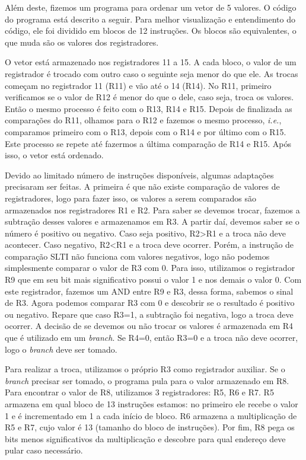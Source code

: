 \documentclass[11pt,a4paper,titlepage]{article}
\begin{document}
Além deste, fizemos um programa para ordenar um vetor de 5 valores.
O código do programa está descrito a seguir.
Para melhor visualização e entendimento do código, ele foi dividido em blocos de 12 instruções.
Os blocos são equivalentes, o que muda são os valores dos registradores.

O vetor está armazenado nos registradores 11 a 15.
A cada bloco, o valor de um registrador é trocado com outro caso o seguinte seja menor do que ele.
As trocas começam no registrador 11 (R11) e vão até o 14 (R14).
No R11, primeiro verificamos se o valor de R12 é menor do que o dele, caso seja, troca os valores.
Então o mesmo processo é feito com o R13, R14 e R15.
Depois de finalizada as comparações do R11, olhamos para o R12 e fazemos o mesmo processo, \textit{i.e.}, comparamos primeiro com o R13, depois com o R14 e por último com o R15.
Este processo se repete até fazermos a última comparação de R14 e R15.
Após isso, o vetor está ordenado.

Devido ao limitado número de instruções disponíveis, algumas adaptações precisaram ser feitas.
A primeira é que não existe comparação de valores de registradores, logo para fazer isso, os valores a serem comparados são armazenados nos registradores R1 e R2.
Para saber se devemos trocar, fazemos a subtração desses valores e armazenamos em R3.
A partir daí, devemos saber se o número é positivo ou negativo.
Caso seja positivo, R2>R1 e a troca não deve acontecer.
Caso negativo, R2<R1 e a troca deve ocorrer.
Porém, a instrução de comparação SLTI não funciona com valores negativos, logo não podemos simplesmente comparar o valor de R3 com 0.
Para isso, utilizamos o registrador R9 que em seu bit mais significativo possui o valor 1 e nos demais o valor 0.
Com este registrador, fazemos um AND entre R9 e R3, dessa forma, sabemos o sinal de R3.
Agora podemos comparar R3 com 0 e descobrir se o resultado é positivo ou negativo.
Repare que caso R3=1, a subtração foi negativa, logo a troca deve ocorrer.
A decisão de se devemos ou não trocar os valores é armazenada em R4 que é utilizado em um \textit{branch}.
Se R4=0, então R3=0 e a troca não deve ocorrer, logo o \textit{branch} deve ser tomado.

Para realizar a troca, utilizamos o próprio R3 como registrador auxiliar.
Se o \textit{branch} precisar ser tomado, o programa pula para o valor armazenado em R8.
Para encontrar o valor de R8, utilizamos 3 registradores: R5, R6 e R7.
R5 armazena em qual bloco de 13 instruções estamos: no primeiro ele recebe o valor 1 e é incrementado em 1 a cada início de bloco.
R6 armazena a multiplicação de R5 e R7, cujo valor é 13 (tamanho do bloco de instruções).
Por fim, R8 pega os bits menos significativos da multiplicação e descobre para qual endereço deve pular caso necessário.
\end{document}
